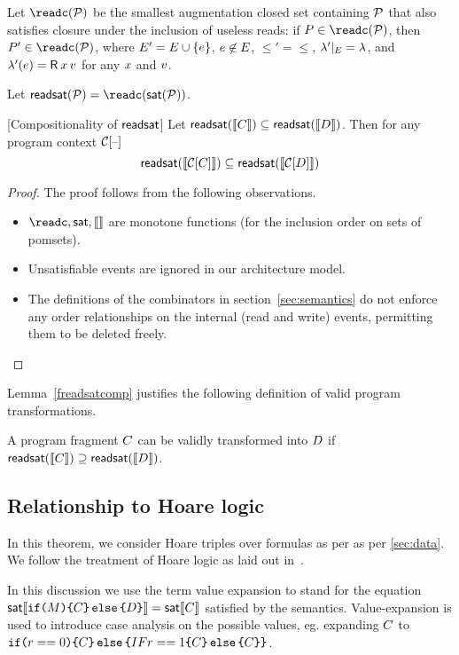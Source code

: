Let $\readc(\aPSS)$ be the smallest augmentation
closed set containing $\mathcal{P}$ that also satisfies closure under the inclusion
of useless reads: if $\aPS \in \readc(\aPSS)$, then
$\aPS' \in \readc(\aPSS)$, where $E'= E\cup\{e\}$,
$e \not \in E$, ${\le'} ={\le}$,
${\lambda'} \mathbin{|}_{E} = {\lambda}$, and
$\labeling'(\aEv) = \DR{\aLoc}{\aVal}$ for any $x$ and $v$.

Let $\freadsat(\aPSS)= \readc(\fsat(\aPSS))$.

\begin{lemma}\label{freadssatcomp}[Compositionality of $\mathsf{readsat}$]
Let $\mathsf{readsat}(\llbracket C\rrbracket) \subseteq \mathsf{readsat}(\llbracket D\rrbracket)$.  Then for any program context $\aCtxt\hole{}$
\[ \freadsat(\sem{\aCtxt\hole{\aCmd}}) \subseteq \freadsat(\sem{\aCtxt\hole{\bCmd}}) \]
\begin{proof}
The proof follows from the following observations.
\begin{itemize}
\item $\readc, \fsat, \sem{}$ are monotone functions (for the inclusion order on sets of pomsets). 
\item Unsatisfiable events are ignored in our architecture model.  
\item The definitions of the combinators in section~\ref{sec:semantics} do not enforce any order relationships on the internal (read and write) events, permitting them to be deleted freely.
\end{itemize}
\end{proof}
\end{lemma}
Lemma~\ref{freadsatcomp} justifies the following definition of valid program transformations. 
\begin{definition}
A program fragment $C$ can be validly transformed into $D$ if  $\mathsf{readsat}(\llbracket C\rrbracket) \supseteq  \mathsf{readsat}(\llbracket D\rrbracket)$.
\end{definition}


\subsection{Relationship to Hoare logic}
In this theorem, we consider Hoare triples over formulas as per as per \textsection\ref{sec:data}.  We follow the treatment of Hoare logic as laid out in~\citet{gordonHoare}.  

In this discussion we use the term value expansion to stand for the equation 
$\mathsf{sat}\llbracket\texttt{if}\allowbreak\texttt{(}M\texttt{)}\allowbreak\texttt{\{}C\texttt{\}}\,\allowbreak\texttt{else}\allowbreak\,\texttt{\{}D\texttt{\}}\rrbracket =
  \mathsf{sat}\llbracket C\rrbracket$ satisfied by the semantics.  Value-expansion is used to introduce case analysis on the possible values, eg. expanding $C$ to 
$\texttt{if}\allowbreak\texttt{(}r ==0\texttt{)}\allowbreak\texttt{\{}C\texttt{\}}\,\allowbreak\texttt{else}\allowbreak\,\texttt{\{} IF{r ==1}\allowbreak\texttt{\{}C\texttt{\}}\,\allowbreak\texttt{else}\allowbreak\,\texttt{\{} C\texttt{\}}\texttt{\}}$.  

